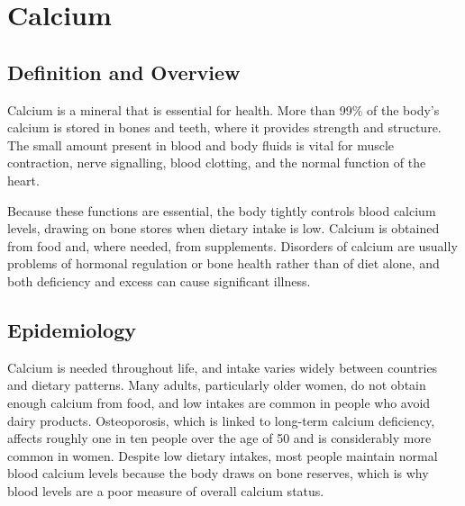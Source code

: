 \chapter{Calcium}

\section*{Definition and Overview}
Calcium is a mineral that is essential for health. More than 99\% of the body's calcium is stored in bones and teeth, where it provides strength and structure. The small amount present in blood and body fluids is vital for muscle contraction, nerve signalling, blood clotting, and the normal function of the heart.

Because these functions are essential, the body tightly controls blood calcium levels, drawing on bone stores when dietary intake is low. Calcium is obtained from food and, where needed, from supplements. Disorders of calcium are usually problems of hormonal regulation or bone health rather than of diet alone, and both deficiency and excess can cause significant illness.

\section*{Epidemiology}
Calcium is needed throughout life, and intake varies widely between countries and dietary patterns. Many adults, particularly older women, do not obtain enough calcium from food, and low intakes are common in people who avoid dairy products. Osteoporosis, which is linked to long-term calcium deficiency, affects roughly one in ten people over the age of 50 and is considerably more common in women. Despite low dietary intakes, most people maintain normal blood calcium levels because the body draws on bone reserves, which is why blood levels are a poor measure of overall calcium status.

